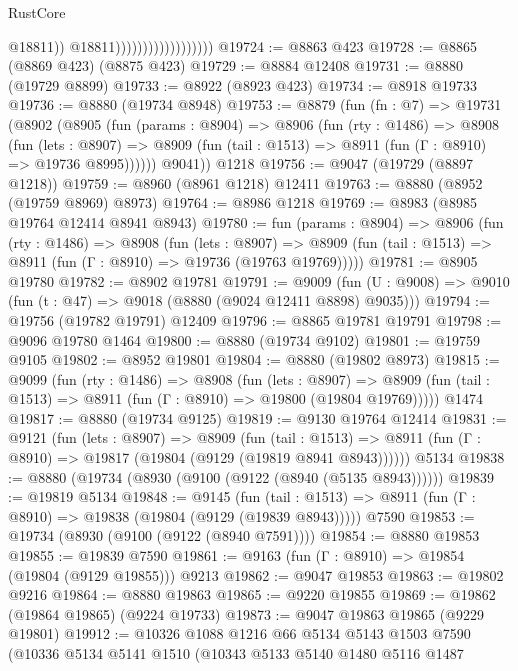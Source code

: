 \begin{lexlean}{RustCore}
\begin{coremodule}
                                            @18811))
                                        @18811))))))))))))))))))
@19724 := @8863 @423
@19728 := @8865 (@8869 @423) (@8875 @423)
@19729 := @8884 @12408
@19731 := @8880 (@19729 @8899)
@19733 := @8922 (@8923 @423)
@19734 := @8918 @19733
@19736 := @8880 (@19734 @8948)
@19753 := @8879
    (fun (fn : @7) =>
    @19731
      (@8902
        (@8905
          (fun (params : @8904) =>
          @8906
            (fun (rty : @1486) =>
            @8908
              (fun (lets : @8907) =>
              @8909 (fun (tail : @1513) => @8911 (fun (Γ : @8910) => @19736 @8995))))))
        @9041))
    @1218
@19756 := @9047 (@19729 (@8897 @1218))
@19759 := @8960 (@8961 @1218) @12411
@19763 := @8880 (@8952 (@19759 @8969) @8973)
@19764 := @8986 @1218
@19769 := @8983 (@8985 @19764 @12414 @8941 @8943)
@19780 := fun (params : @8904) =>
  @8906
    (fun (rty : @1486) =>
    @8908
      (fun (lets : @8907) =>
      @8909 (fun (tail : @1513) => @8911 (fun (Γ : @8910) => @19736 (@19763 @19769)))))
@19781 := @8905 @19780
@19782 := @8902 @19781
@19791 := @9009
    (fun (U : @9008) => @9010 (fun (t : @47) => @9018 (@8880 (@9024 @12411 @8898) @9035)))
@19794 := @19756 (@19782 @19791) @12409
@19796 := @8865 @19781 @19791
@19798 := @9096 @19780 @1464
@19800 := @8880 (@19734 @9102)
@19801 := @19759 @9105
@19802 := @8952 @19801
@19804 := @8880 (@19802 @8973)
@19815 := @9099
    (fun (rty : @1486) =>
    @8908
      (fun (lets : @8907) =>
      @8909 (fun (tail : @1513) => @8911 (fun (Γ : @8910) => @19800 (@19804 @19769)))))
    @1474
@19817 := @8880 (@19734 @9125)
@19819 := @9130 @19764 @12414
@19831 := @9121
    (fun (lets : @8907) =>
    @8909
      (fun (tail : @1513) =>
      @8911 (fun (Γ : @8910) => @19817 (@19804 (@9129 (@19819 @8941 @8943))))))
    @5134
@19838 := @8880 (@19734 (@8930 (@9100 (@9122 (@8940 (@5135 @8943))))))
@19839 := @19819 @5134
@19848 := @9145
    (fun (tail : @1513) => @8911 (fun (Γ : @8910) => @19838 (@19804 (@9129 (@19839 @8943)))))
    @7590
@19853 := @19734 (@8930 (@9100 (@9122 (@8940 @7591))))
@19854 := @8880 @19853
@19855 := @19839 @7590
@19861 := @9163 (fun (Γ : @8910) => @19854 (@19804 (@9129 @19855))) @9213
@19862 := @9047 @19853
@19863 := @19802 @9216
@19864 := @8880 @19863
@19865 := @9220 @19855
@19869 := @19862 (@19864 @19865) (@9224 @19733)
@19873 := @9047 @19863 @19865 (@9229 @19801)
@19912 := @10326
    @1088
    @1216
    @66
    @5134
    @5143
    @1503
    @7590
    (@10336
      @5134
      @5141
      @1510
      (@10343
        @5133
        @5140
        @1480
        @5116
        @1487

\end{coremodule}
\end{lexlean}
